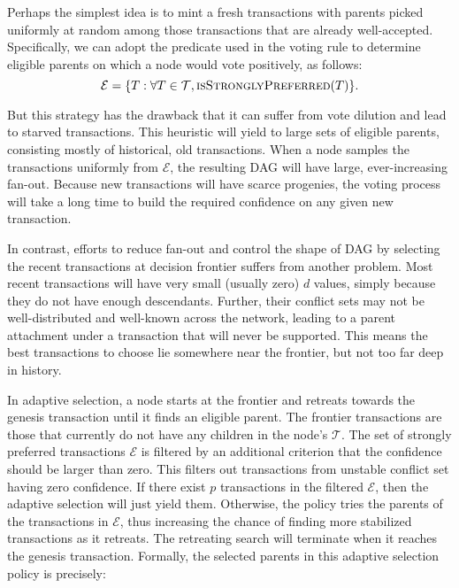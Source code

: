 Perhaps the simplest idea is to mint a fresh transactions with parents picked uniformly at random
among those transactions that are already well-accepted. Specifically, we can adopt the predicate
used in the voting rule to determine eligible parents on which a node would vote positively, as follows:
\[
    \mathcal{E} = \{T: \forall T\in\mathcal{T}, \textsc{isStronglyPreferred}(T)\}.
\]

But this strategy has the drawback that it can suffer from vote dilution and lead to starved transactions.
This heuristic will yield to large sets of eligible parents, consisting mostly of historical, old transactions.
When a node samples the transactions uniformly from $\mathcal{E}$, the resulting DAG
will have large, ever-increasing fan-out. Because new transactions will have scarce progenies,
the voting process will take a long time to build the required confidence on any given new transaction.

In contrast, efforts to reduce fan-out and control the shape of DAG by selecting the recent transactions at
decision frontier suffers from another problem. Most recent transactions will have very small (usually zero) $d$ values,
simply because they do not have enough descendants. Further, their conflict sets may not be well-distributed
and well-known across the network, leading to a parent attachment under a transaction that will never be supported.
This means the best transactions to choose lie somewhere near the frontier, but not too far deep in history.

In adaptive selection, a node starts at the frontier and retreats towards the genesis transaction until it finds an eligible parent.
The frontier transactions are those that currently do not have any children in the node's $\mathcal{T}$.
The set of strongly preferred transactions $\mathcal{E}$ is filtered by an additional criterion that the confidence should be larger than zero. This filters out transactions from unstable conflict set having zero confidence.
If there exist $p$ transactions in the filtered $\mathcal{E}$, then the adaptive selection will just yield them.
Otherwise, the policy tries the parents of the transactions in $\mathcal{E}$, thus increasing the chance of finding more stabilized transactions as it retreats.
The retreating search will terminate when it reaches the genesis transaction.
Formally, the selected parents in this adaptive selection policy is precisely:

